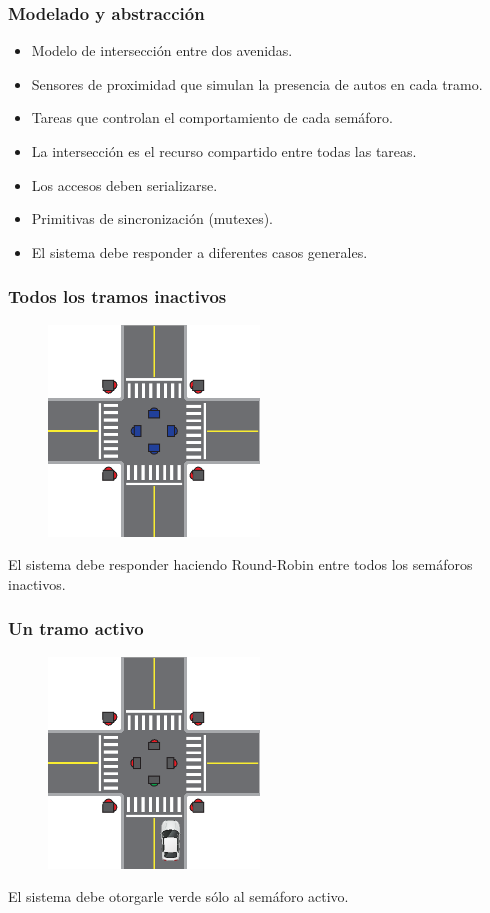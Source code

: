 \begin{frame}
\frametitle{Modelado y abstracción}
\begin{block}{}
	\begin{itemize}
		\item Modelo de intersección entre dos avenidas.
		\item Sensores de proximidad que simulan la presencia de autos en cada tramo.
		\item Tareas que controlan el comportamiento de cada semáforo.
		\item La intersección es el recurso compartido entre todas las tareas.
		\item Los accesos deben serializarse.
		\item Primitivas de sincronización (mutexes).
		\item El sistema debe responder a diferentes casos generales.
	\end{itemize}
\end{block}
\end{frame}

\begin{frame}
\frametitle{Todos los tramos inactivos}
	\begin{figure}[htbp]
		\centering
		\includegraphics[width=0.50\textwidth]{diagramas/ningun-activo.eps}
	\end{figure}
	El sistema debe responder haciendo Round-Robin entre todos los semáforos inactivos.
\end{frame}

\begin{frame}
\frametitle{Un tramo activo}
\begin{figure}[htbp]
	\centering
	\includegraphics[width=0.50\textwidth]{diagramas/un-activo.eps}
\end{figure}
El sistema debe otorgarle verde sólo al semáforo activo.
\end{frame}

